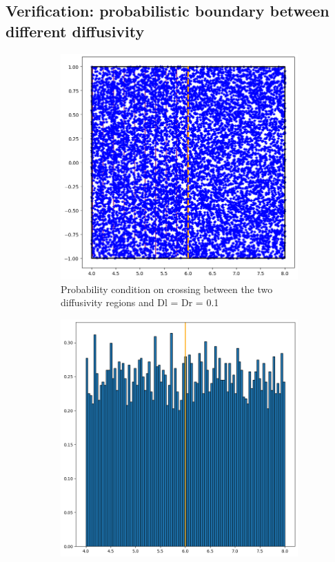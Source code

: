 \documentclass{article}
\begin{document}
\subsection{Verification: probabilistic boundary between different diffusivity}
\begin{figure}[htbp]
    \centering
    \begin{subfigure}[b]{0.45\textwidth}
        \centering
        \includegraphics[width=\textwidth]{images/positionsDl01Dr01RlPlRrPr.png}
        \caption{Probability condition on crossing between the two diffusivity regions and Dl = Dr = 0.1}
    \end{subfigure}
    \hfill
    \begin{subfigure}[b]{0.45\textwidth}
        \centering
        \includegraphics[width=\textwidth]{images/histDl01Dr01RlPlRrPr.png}

\end{subfigure}
\end{figure}
\end{document}
